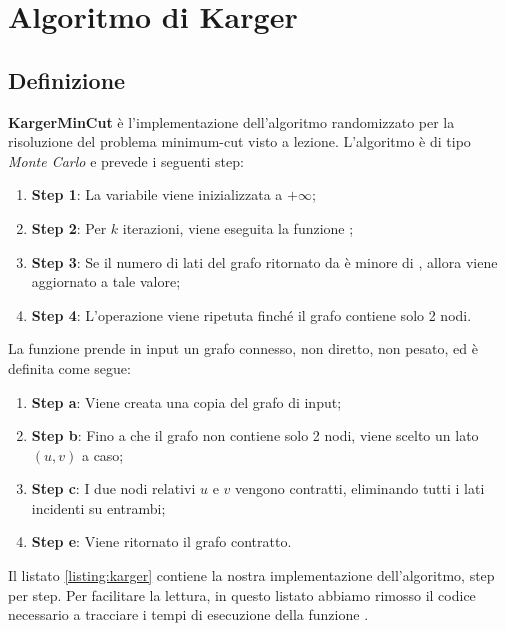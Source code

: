 \section{Algoritmo di Karger}
\label{cap:algorithm-karger}

\subsection{Definizione}
\label{sub:karger-definition}

\textbf{KargerMinCut} è l'implementazione dell'algoritmo randomizzato per la risoluzione del problema minimum-cut visto a lezione. L'algoritmo è di tipo \textit{Monte Carlo} e prevede i seguenti step:

\begin{enumerate}
    \item \textbf{Step 1}: La variabile  viene inizializzata a $+\infty$;
    \item \textbf{Step 2}: Per $k$ iterazioni, viene eseguita la funzione ;
    \item \textbf{Step 3}: Se il numero di lati del grafo ritornato da  è minore di , allora  viene aggiornato a tale valore;
    \item \textbf{Step 4}: L'operazione viene ripetuta finché il grafo contiene solo 2 nodi.
\end{enumerate}

\noindent La funzione  prende in input un grafo connesso, non diretto, non pesato, ed è definita come segue:

\begin{enumerate}
    \item \textbf{Step a}: Viene creata una copia del grafo di input;
    \item \textbf{Step b}: Fino a che il grafo non contiene solo 2 nodi, viene scelto un lato $(u, v)$ a caso;
    \item \textbf{Step c}: I due nodi relativi $u$ e $v$ vengono contratti, eliminando tutti i lati incidenti su entrambi;
    \item \textbf{Step e}: Viene ritornato il grafo contratto.
\end{enumerate}

\noindent Il listato \ref{listing:karger} contiene la nostra implementazione dell'algoritmo, step per step. Per facilitare la lettura, in questo listato abbiamo rimosso il codice necessario a tracciare i tempi di esecuzione della funzione .\\

